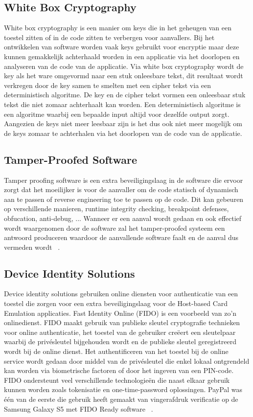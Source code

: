 \subsection{White Box Cryptography}
White box cryptography is een manier om keys die in het geheugen van een toestel zitten of in de code zitten te verbergen voor aanvallers. Bij het ontwikkelen van software worden vaak keys gebruikt voor encryptie maar deze kunnen gemakkelijk achterhaald worden in een applicatie via het doorlopen en analyseren van de code van de applicatie. Via white box cryptography wordt de key als het ware omgevormd naar een stuk onleesbare tekst, dit resultaat wordt verkregen door de key samen te smelten met een cipher tekst via een deterministisch algoritme. De key en de cipher tekst vormen een onleesbaar stuk tekst die niet zomaar achterhaalt kan worden. Een deterministisch algoritme is een algoritme waarbij een bepaalde input altijd voor dezelfde output zorgt. Aangezien de keys niet meer leesbaar zijn is het dus ook niet meer mogelijk om de keys zomaar te achterhalen via het doorlopen van de code van de applicatie.

\subsection{Tamper-Proofed Software}
Tamper proofing software is een extra beveiligingslaag in de software die ervoor zorgt dat het moeilijker is voor de aanvaller om de code statisch of dynamisch aan te passen of reverse engineering toe te passen op de code. Dit kan gebeuren op verschillende manieren, runtime integrity checking, breakpoint defenses,  obfucation, anti-debug, ... Wanneer er een aanval wordt gedaan en ook effectief wordt waargenomen door de software zal het tamper-proofed systeem een antwoord produceren waardoor de aanvallende software faalt en de aanval dus vermeden wordt ~\autocite{SCA2014}.



\subsection{Device Identity Solutions}
Device identity solutions gebruiken online diensten voor authenticatie van een toestel die zorgen voor een extra beveiligingslaag voor de Host-based Card Emulation applicaties. Fast Identity Online (FIDO) is een voorbeeld van zo'n onlinedienst. FIDO maakt gebruik van publieke sleutel cryptografie technieken voor online authenticatie, het toestel van de gebruiker creëert een sleutelpaar waarbij de privésleutel bijgehouden wordt en de publieke sleutel geregistreerd wordt bij de online dienst. Het authentificeren van het toestel bij de online service wordt gedaan door middel van de privésleutel die enkel lokaal ontgrendeld kan worden via biometrische factoren of door het ingeven van een PIN-code.
FIDO ondersteunt veel verschillende technologieën die naast elkaar gebruik kunnen worden zoals tokenisatie en one-time-password oplossingen. PayPal was één van de eerste die gebruik heeft gemaakt van vingerafdruk verificatie op de Samsung Galaxy S5 met FIDO Ready software ~\autocite{SCA2014}.

